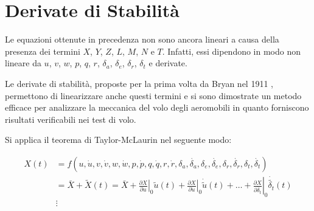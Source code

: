 \section{Derivate di Stabilità}\label{sec:derivateStabilita}

Le equazioni ottenute in precedenza non sono ancora lineari a causa della presenza dei termini $X$, $Y$, $Z$, $L$, $M$, $N$ e $T$. Infatti, essi dipendono in modo non lineare da $u$, $v$, $w$, $p$, $q$, $r$, $\delta_a$, $\delta_e$, $\delta_r$, $\delta_t$ e derivate.

Le derivate di stabilità, proposte per la prima volta da Bryan nel 1911 \cite{bryan_stability_aviation}, permettono di linearizzare anche questi termini e si sono dimostrate un metodo efficace per analizzare la meccanica del volo degli aeromobili in quanto forniscono risultati verificabili nei test di volo.

Si applica il teorema di Taylor-McLaurin nel seguente modo:

\begin{equation*}
    \begin{split}
        X(t) & = f(u, \dot{u}, v, \dot{v}, w, \dot{w}, p, \dot{p}, q, \dot{q}, r, \dot{r}, \delta_a, \dot{\delta_a}, \delta_e, \dot{\delta_e}, \delta_r, \dot{\delta_r}, \delta_t, \dot{\delta_t})                                                                                               \\
             & = \bar{X} + \widetilde{X}(t) = \bar{X} + \left.\frac{\partial X}{\partial u}\right|_0\widetilde{u}(t) + \left.\frac{\partial X}{\partial \dot{u}}\right|_0\dot{\widetilde{u}}(t) + \dots + \left.\frac{\partial X}{\partial \dot{\delta_t}}\right|_0\dot{\widetilde{\delta_t}}(t)
        \\ &\vdots
    \end{split}
\end{equation*}

